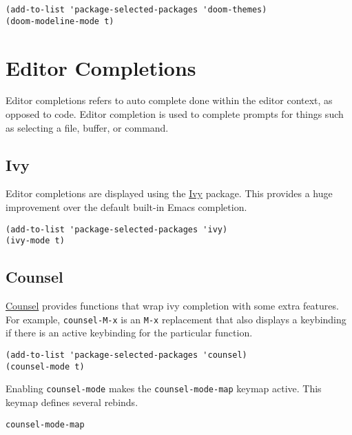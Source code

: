 \documentclass[11pt]{article}
\begin{document}
\begin{verbatim}
(add-to-list 'package-selected-packages 'doom-themes)
(doom-modeline-mode t)
\end{verbatim}
\section{Editor Completions}
\label{sec:org7b2e0f0}

Editor completions refers to auto complete done within the editor context, as
opposed to code. Editor completion is used to complete prompts for things such
as selecting a file, buffer, or command.
\subsection{Ivy}
\label{sec:org0dc8d65}

Editor completions are displayed using the \href{https://github.com/abo-abo/swiper?tab=readme-ov-file\#ivy}{Ivy} package. This provides a huge
improvement over the default built-in Emacs completion.

\begin{verbatim}
(add-to-list 'package-selected-packages 'ivy)
(ivy-mode t)
\end{verbatim}
\subsection{Counsel}
\label{sec:org4085ed6}

\href{https://github.com/abo-abo/swiper?tab=readme-ov-file\#counsel}{Counsel} provides functions that wrap ivy completion with some extra
features. For example, \texttt{counsel-M-x} is an \texttt{M-x} replacement that also displays
a keybinding if there is an active keybinding for the particular function.

\begin{verbatim}
(add-to-list 'package-selected-packages 'counsel)
(counsel-mode t)
\end{verbatim}

Enabling \texttt{counsel-mode} makes the \texttt{counsel-mode-map} keymap active. This keymap
defines several rebinds.

\begin{verbatim}
counsel-mode-map
\end{verbatim}
\end{document}
